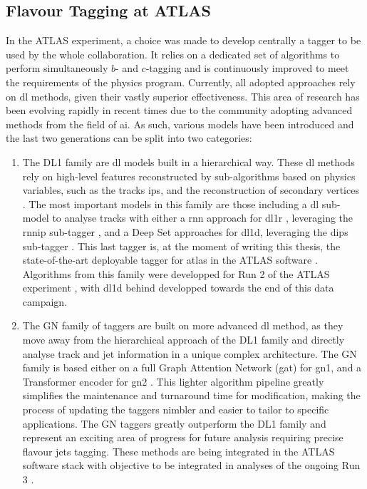 \subsection{Flavour Tagging at ATLAS}
In the ATLAS experiment, a choice was made to develop centrally a tagger to be used by the whole collaboration. It relies on a dedicated set of algorithms to perform simultaneously $b$- and $c$-tagging and is continuously improved to meet the requirements of the physics program. Currently, all adopted approaches rely on \gls{dl} methods, given their vastly superior effectiveness. This area of research has been evolving rapidly in recent times due to the community adopting advanced methods from the field of \gls{ai}. As such, various models have been introduced and the last two generations can be split into two categories: 
\begin{enumerate}
  \item The DL1 family are \gls{dl} models built in a hierarchical way. These \gls{dl} methods rely on high-level features reconstructed by sub-algorithms based on physics variables, such as the tracks \glspl{ip}, and the reconstruction of secondary vertices \cite{ATL-PHYS-PUB-2015-022}. The most important models in this family are those including a \gls{dl} sub-model to analyse tracks with either a \gls{rnn} approach for \gls{dl1r} \cite{ATLAS:2017bcq}, leveraging the \gls{rnnip} sub-tagger \cite{ATL-PHYS-PUB-2017-003}, and a Deep Set approaches for \gls{dl1d}, leveraging the \gls{dips} sub-tagger \cite{ATL-PHYS-PUB-2020-014}. This last tagger is, at the moment of writing this thesis, the state-of-the-art deployable tagger for \gls{atlas} in the ATLAS software \cite{ATL-SOFT-PUB-2021-001}. Algorithms from this family were developped for Run 2 of the ATLAS experiment \cite{atlas:FTAGRUN2}, with \gls{dl1d} behind developped towards the end of this data campaign.
  \item The GN family of taggers are built on more advanced \gls{dl} method, as they move away from the hierarchical approach of the DL1 family and directly analyse track and jet information in a unique complex architecture. The GN family is based either on a full Graph Attention Network (\gls{gat}) for \gls{gn1}, and a Transformer encoder for \gls{gn2} \cite{ATL-PHYS-PUB-2022-027, ATL-PLOT-FTAG-2023-01, duperrin2023flavour}. This lighter algorithm pipeline greatly simplifies the maintenance and turnaround time for modification, making the process of updating the taggers nimbler and easier to tailor to specific applications. The GN taggers greatly outperform the DL1 family and represent an exciting area of progress for future analysis requiring precise flavour jets tagging. These methods are being integrated in the ATLAS software stack with objective to be integrated in analyses of the ongoing Run 3 \cite{ATL-SOFT-PUB-2021-001}.  
\end{enumerate}

